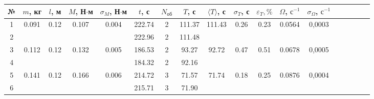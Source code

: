 \documentclass[12pt, a4paper]{article}
\begin{document}
\begin{table}[h!]
	\centering
	\begin{tabular}{|c|c|c|c|c|c|c|c|c|c|c|c|c|c|c|c|c|c|}
		\hline
		№  & $ m $, кг          & $ l $, м            & $ M $, Н$\cdot$м      & $ \sigma_M $, Н$\cdot$м             & $ t $, с & $ N_\text{об} $ & $ T $, с & $ \langle T \rangle $, с   & $ \sigma_T $, с          &  $ \varepsilon_T, \%$   & $ \Omega $, $ \text{с}^{-1} $ & $ \sigma_\Omega $, $ \text{с}^{-1} $ \\ \hline
	1  & \multirow{2}{*}{0.091} & \multirow{2}{*}{0.12} & \multirow{2}{*}{0.107} & \multirow{2}{*}{0.004} & 222.74            & 2             & 111.37              & \multirow{2}{*}{111.43} & \multirow{2}{*}{0.26} & \multirow{2}{*}{0.23}  & \multirow{2}{*}{0.0564}                   & \multirow{2}{*}{0,0003} \\ \cline{1-1} \cline{6-8}
	2  &                        &                       &                        &                        & 222.96            & 2             & 111.48              &                        &                       &                        &                                           &                         \\ \hline \hline
	3  & \multirow{2}{*}{0.112} & \multirow{2}{*}{0.12} & \multirow{2}{*}{0.132} & \multirow{2}{*}{0.005} & 186.53            & 2              & 93.27              & \multirow{2}{*}{92.72} & \multirow{2}{*}{0.47} & \multirow{2}{*}{0.51}  & \multirow{2}{*}{0.0678}                   & \multirow{2}{*}{0,0005} \\ \cline{1-1} \cline{6-8}
	4  &                        &                       &                        &                        & 184.32            & 2              & 92.16              &                        &                       &                        &                                           &                         \\ \hline \hline
	5  & \multirow{2}{*}{0.141} & \multirow{2}{*}{0.12} & \multirow{2}{*}{0.166} & \multirow{2}{*}{0.006} & 214.72            & 3              & 71.57              & \multirow{2}{*}{71.74} & \multirow{2}{*}{0.18} & \multirow{2}{*}{0.25}  & \multirow{2}{*}{0.0876}                   & \multirow{2}{*}{0,0004} \\ \cline{1-1} \cline{6-8}
	6  &                        &                       &                        &                        & 215.71            & 3              & 71.90              &                        &                       &                        &                                           &                         \\ \hline \hline

\end{tabular}
\end{table}
\end{document}
